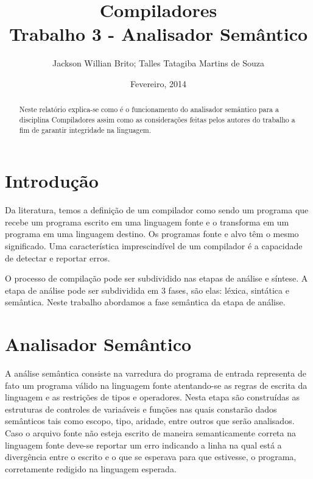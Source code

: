 \documentclass[a4paper,12pt]{report}
\begin{document}
\title{Compiladores\\Trabalho 3 - Analisador Sem\^antico}
\author{Jackson Willian Brito; Talles Tatagiba Martins de Souza}
\date{Fevereiro, 2014}
\maketitle

\pagebreak

\tableofcontents

\pagebreak

\renewcommand{\thesection}{\arabic{section}} 

\begin{abstract}
Neste relat\'orio explica-se como \'e o funcionamento do analisador sem\^antico para a disciplina Compiladores assim como as considera\c{c}\~oes feitas pelos autores do trabalho a fim de garantir integridade na linguagem.
\end{abstract}

\section{Introdu\c{c}\~ao}

Da literatura, temos a defini\c{c}\~ao de um compilador como sendo um programa que recebe um programa escrito em uma linguagem
fonte e o transforma em um programa em uma linguagem destino. Os programas fonte e alvo t\^em o mesmo significado. Uma caracter\'istica
imprescind\'ivel de um compilador \'e a capacidade de detectar e reportar erros.

O processo de compila\c{c}\~ao pode ser subdividido nas etapas de an\'alise e s\'intese. A etapa de an\'alise pode ser subdividida em 
3 fases, s\~ao elas: l\'exica, sint\'atica e sem\^antica. Neste trabalho abordamos a fase sem\^antica da etapa de an\'alise.

\section{Analisador Sem\^antico}

A an\'alise sem\^antica consiste na varredura do programa de entrada representa de fato
um programa v\'alido na linguagem fonte atentando-se as regras de escrita da linguagem e 
as restri\c{c}\~oes de tipos e operadores. Nesta etapa s\~ao constru\'idas as estruturas de
controles de varia\'aveis e fun\c{c}\~oes nas quais constar\~ao dados sem\^anticos tais como
escopo, tipo, aridade, entre outros que ser\~ao analisados. Caso o arquivo fonte n\~ao esteja 
escrito de maneira semanticamente correta na linguagem fonte deve-se
reportar um erro indicando a linha na qual est\'a a diverg\^encia entre o escrito e o que 
se esperava para que estivesse, o programa, corretamente redigido na linguagem esperada.
\end{document}
